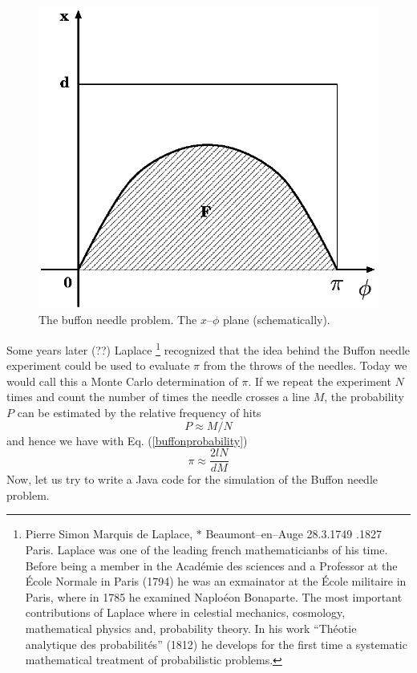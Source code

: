 \begin{figure}
\label{buffonplane}
\includegraphics{Figures/buffonplane.eps}
\caption{The buffon needle problem. The $x$--$\phi$ plane (schematically).}
\end{figure}

Some years later (??) Laplace 
\footnote{Pierre Simon Marquis de Laplace, $\ast$ Beaumont--en--Auge
  28.3.1749 .1827 Paris. Laplace was one of the leading french
  mathematicianbs of his time. Before being a member in the Acad\'emie
  des sciences and a Professor at the \'Ecole Normale in Paris (1794)
he was an exmainator at the \'Ecole militaire in Paris, where in 1785
he examined Naplo\'eon Bonaparte. The most important contributions of
Laplace where in celestial mechanics, cosmology, mathematical physics
and, probability theory. In his work ``Th\'eotie analytique des
probabilit\'es'' (1812) he develops  for the first time a systematic
mathematical treatment of probabilistic problems.} recognized that
the idea behind the Buffon needle experiment could be used to evaluate
$\pi$ from the throws of the needles. Today we would call this a
Monte Carlo determination of $\pi$. If we repeat the experiment $N$
times and count the number of times the needle crosses a line $M$, the
probability $P$ can be estimated by the relative frequency of hits
\begin{equation}
\label{buffonestimateP}
P \approx M/N
\end{equation}
and hence we have with Eq. (\ref{buffonprobability})
\begin{equation}
\pi \approx \frac{2lN}{dM}
\end{equation}
Now, let us try to write a Java code for the simulation of the Buffon
needle problem.


